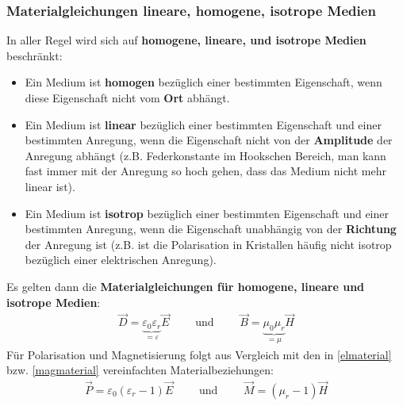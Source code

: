  \subsubsection{Materialgleichungen lineare, homogene, isotrope Medien}
 In aller Regel wird sich auf \textbf{homogene, lineare, und isotrope
 	Medien} beschränkt:
 \begin{itemize}
 	\item Ein Medium ist \textbf{homogen} bezüglich einer bestimmten Eigenschaft,
 	wenn diese Eigenschaft nicht vom \textbf{Ort} abhängt.
 	
 	\item Ein Medium ist \textbf{linear} bezüglich einer bestimmten Eigenschaft
 	und einer bestimmten Anregung, wenn die Eigenschaft nicht von der \textbf{Amplitude}
 	der Anregung abhängt (z.B. Federkonstante im Hookschen Bereich, man kann fast immer mit der Anregung so hoch gehen, dass das Medium nicht mehr linear ist).
 	
 	\item Ein Medium ist \textbf{isotrop} bezüglich einer bestimmten Eigenschaft
 	und einer bestimmten Anregung, wenn die Eigenschaft unabhängig von der \textbf{Richtung}
 	der Anregung ist (z.B. ist die Polarisation in Kristallen häufig nicht
 	isotrop bezüglich einer elektrischen Anregung).
 \end{itemize}
 Es gelten dann die \textbf{Materialgleichungen für homogene, lineare und
 	isotrope Medien}:
 \begin{equation} \label{matlinhomis}
 	\begin{split}
 		\vec{D}= \underbrace{\varepsilon_0\varepsilon_r}_{=\varepsilon}\vec{E}\qquad
 		\text{ und }\qquad\vec{B}= \underbrace{\mu_0 \mu_r}_{=\mu}\vec{H}
 	\end{split}
 \end{equation}
 Für Polarisation und Magnetisierung folgt aus Vergleich mit den in \ref{elmaterial} bzw. \ref{magmaterial} vereinfachten Materialbeziehungen:
 \begin{equation}\label{polmaglin}
 	\begin{split} 
 		\vec{P}= \varepsilon_{0}(\varepsilon_{r} - 1) \vec{E}\qquad \text{ und }\qquad
 		\vec{M}= (\mu_{r}-1) \vec{H}
 	\end{split}
 \end{equation}
